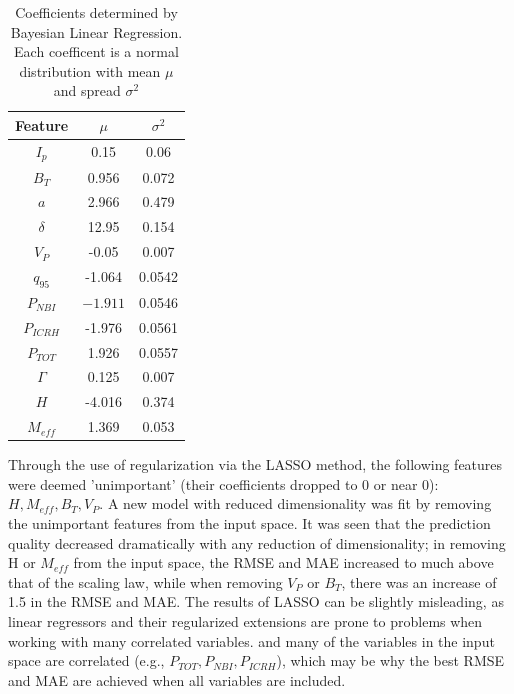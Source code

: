 \documentclass[a4paper, twoside, final, 12pt]{article}
\begin{document}
{\begin{table}
\centering
\caption{Coefficients determined by Bayesian Linear Regression. Each coefficent is a normal distribution with mean $\mu$ and spread $\sigma^2$}\label{tab:new_coef}
\begin{tabular}{ | c | c | c |}
			\hline
			Feature & $\mu$ & $\sigma^2$ \\
			\hline
			$I_p$ & 0.15 & 0.06 \\
			$B_T$ & 0.956 & 0.072 \\
			$a$ & 2.966 & 0.479 \\
			$\delta$ & 12.95 & 0.154 \\
			$V_P$ & -0.05 & 0.007 \\
			$q_{95}$ & -1.064 & 0.0542 \\
			$P_{NBI}$ & $-1.911$ & 0.0546 \\
			$P_{ICRH}$ & -1.976 & 0.0561 \\
			$P_{TOT}$ & 1.926 & 0.0557 \\
			$\Gamma$ & 0.125 & 0.007 \\
			$H$ & -4.016 & 0.374  \\
			$M_{eff}$ & 1.369 & 0.053 \\
			\hline
\end{tabular}
\end{table}

Through the use of regularization via the LASSO method, the following features were deemed 'unimportant' (their coefficients dropped to 0 or near 0): $H, M_{eff}, B_T, V_P$.
A new model with reduced dimensionality was fit by removing the unimportant features from the input space.
It was seen that the prediction quality decreased dramatically with any reduction of dimensionality; in removing H or $M_{eff}$ from the input space, the RMSE and MAE increased to much above that of the scaling law, while when removing $V_P$ or $B_T$, there was an increase of 1.5 in the RMSE and MAE. 
The results of LASSO can be slightly misleading, as linear regressors and their regularized extensions are prone to problems when working with many correlated variables. and many of the variables in the input space are correlated (e.g., $P_{TOT}, P_{NBI}, P_{ICRH}$), which may be why the best RMSE and MAE are achieved when all variables are included.

}
\end{document}
